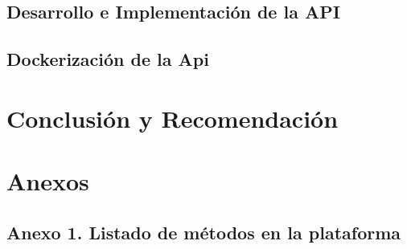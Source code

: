 \documentclass[letterpaper, 12pt]{report}
\begin{document}
\section{Desarrollo e Implementación de la API}


\section{Dockerización de la Api}


\chapter{Conclusión y Recomendación}


\begin{doublespace}
  
  
\end{doublespace}

\chapter*{Anexos}
\section*{Anexo 1. Listado de métodos en la plataforma}

\end{document}
